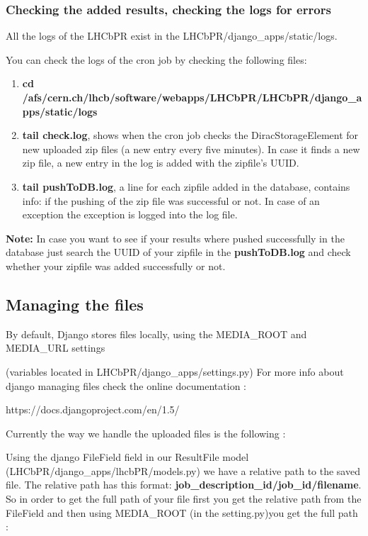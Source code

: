 \documentclass{lhcbnote}
\begin{document}
\subsubsection{Checking the added results, checking the logs for errors}
All the logs of the LHCbPR exist in the LHCbPR/django\_apps/static/logs.

You can check the logs of the cron job by checking the following files:

\begin{enumerate}
\item
{\bf cd /afs/cern.ch/lhcb/software/webapps/LHCbPR/LHCbPR/django\_apps/static/logs}
\item
{\bf tail check.log}, shows when the cron job checks the DiracStorageElement for new uploaded zip files (a new entry every five minutes). In case it finds a 
new zip file, a new entry in the log is added with the zipfile's UUID.
\item 
{\bf tail pushToDB.log}, a line for each zipfile added in the database, contains info: if the pushing of the zip file was successful or not. In 
case of an exception the exception is logged into the log file. 
\end{enumerate}

{\bf Note:} In case you want to see if your results where pushed successfully in the database just search the UUID of your zipfile in the {\bf pushToDB.log} and 
check whether your  zipfile was added successfully or not. 

\subsection {Managing the files}

By default, Django stores files locally, using the MEDIA\_ROOT and MEDIA\_URL settings 

(variables located in LHCbPR/django\_apps/settings.py)
For more info about django managing files check the online documentation : 

https://docs.djangoproject.com/en/1.5/

Currently the way we handle the uploaded files is the following :

Using the django FileField field in our ResultFile model (LHCbPR/django\_apps/lhcbPR/models.py) we have a relative 
path to the saved file. The relative path has this format: {\bf job\_description\_id/job\_id/filename}. So in order to get the full path of your file 
first you get the relative path from the FileField and then using MEDIA\_ROOT (in the setting.py)you get the full path :
\end{document}
